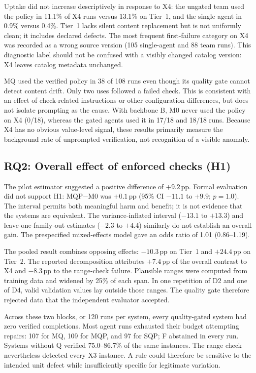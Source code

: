 \documentclass[conference]{IEEEtran}
\newcommand{\sys}[1]{\textsf{#1}}
\begin{document}
Uptake did not increase descriptively in response to X4: the ungated team used the policy in 11.1\% of X4 runs versus 13.1\% on Tier~1, and the single agent in 0.9\% versus 0.4\%. Tier~1 lacks silent content replacement but is not uniformly clean; it includes declared defects. The most frequent first-failure category on X4 was recorded as a wrong source version (105 single-agent and 88 team runs). This diagnostic label should not be confused with a visibly changed catalog version: X4 leaves catalog metadata unchanged.

\sys{MQ} used the verified policy in 38 of 108 runs even though its quality gate cannot detect content drift. Only two uses followed a failed check. This is consistent with an effect of check-related instructions or other configuration differences, but does not isolate prompting as the cause. With backbone B, \sys{M0} never used the policy on X4 (0/18), whereas the gated agents used it in 17/18 and 18/18 runs. Because X4 has no obvious value-level signal, these results primarily measure the background rate of unprompted verification, not recognition of a visible anomaly.

\subsection{RQ2: Overall effect of enforced checks (H1)}
The pilot estimator suggested a positive difference of $+9.2$\,pp. Formal evaluation did not support H1: \sys{MQP}$-$\sys{M0} was $+0.1$\,pp (95\% CI $-11.1$ to $+9.9$; $p=1.0$). The interval permits both meaningful harm and benefit; it is not evidence that the systems are equivalent. The variance-inflated interval ($-13.1$ to $+13.3$) and leave-one-family-out estimates ($-2.3$ to $+4.4$) similarly do not establish an overall gain. The prespecified mixed-effects model gave an odds ratio of 1.01 (0.86--1.19).

The pooled result combines opposing effects: $-10.3$\,pp on Tier~1 and $+24.4$\,pp on Tier~2. The reported decomposition attributes $+7.4$\,pp of the overall contrast to X4 and $-8.3$\,pp to the range-check failure. Plausible ranges were computed from training data and widened by 25\% of each span. In one repetition of D2 and one of D4, valid validation values lay outside those ranges. The quality gate therefore rejected data that the independent evaluator accepted.

Across these two blocks, or 120 runs per system, every quality-gated system had zero verified completions. Most agent runs exhausted their budget attempting repairs: 107 for \sys{MQ}, 109 for \sys{MQP}, and 97 for \sys{SQP}; \sys{F} abstained in every run. Systems without Q verified 75.0--86.7\% of the same instances. The range check nevertheless detected every X3 instance. A rule could therefore be sensitive to the intended unit defect while insufficiently specific for legitimate variation.
\end{document}
